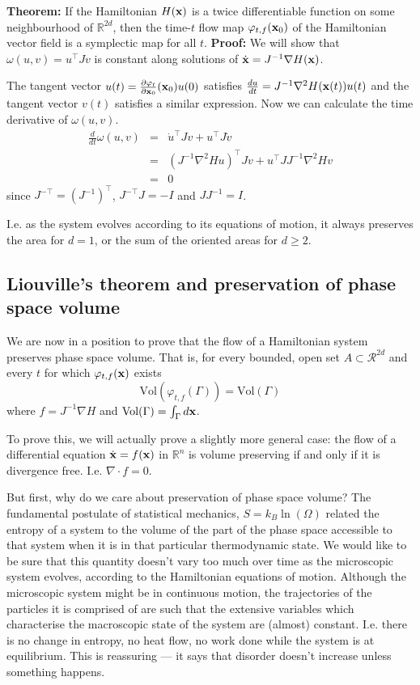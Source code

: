 \documentclass{article}
\begin{document}
{\bf Theorem:} If the Hamiltonian $H({\bf x})$ is a twice differentiable function on some neighbourhood of $\mathbb{R}^{2d}$, then the time-$t$ flow map $\varphi_{t,f}({\bf x}_0)$ of the Hamiltonian vector field is a symplectic map for all $t$.
{\bf Proof:} We will show that $\omega(u,v)=u^\top J v$ is constant along solutions of $\dot{\bf x} = J^{-1}\nabla H({\bf x})$.

The tangent vector $u(t) = \frac{\partial \varphi_t}{\partial {\bf x}_0}({\bf x}_0)u(0)$ satisfies $\frac{du}{dt} = J^{-1}\nabla^2H({\bf x}(t))u(t)$ and the tangent vector $v(t)$ satisfies a similar expression. Now we can calculate the time derivative of $\omega(u,v)$.
\begin{eqnarray*}
	\frac{d}{dt}\omega(u,v) &=& \dot{u}^{\top}Jv+u^\top J\dot{v}\\
		&=& (J^{-1}\nabla^2Hu)^\top Jv + u^\top JJ^{-1}\nabla^2Hv\\
		&=& 0
\end{eqnarray*}
since $J^{-\top}=(J^{-1})^\top$, $J^{-\top}J=-I$ and $JJ^{-1} = I$.

I.e. as the system evolves according to its equations of motion, it always preserves the area for $d=1$, or the sum of the oriented areas for $d \geq2$.


\subsection*{Liouville's theorem and preservation of phase space volume}
We are now in a position to prove that the flow of a Hamiltonian system preserves phase space volume. That is, for every bounded, open set $A\subset\mathcal{R}^{2d}$ and every $t$ for which $\varphi_{t,f}({\bf x})$ exists
$$\text{Vol}(\varphi_{t,f}(\Gamma))=\text{Vol}(\Gamma)$$
where $f=J^{-1}\nabla H$ and $\text{Vol}(\Gamma) = \int_{\Gamma}d{\bf x}$.

To prove this, we will actually prove a slightly more general case: the flow of a differential equation $\dot{\bf x}=f({\bf x})$ in $\mathbb{R}^n$ is volume preserving if and only if it is divergence free. I.e. $\nabla\cdot f=0$.

But first, why do we care about preservation of phase space volume? The fundamental postulate of statistical mechanics, $S=k_B\ln(\Omega)$ related the entropy of a system to the volume of the part of the phase space accessible to that system when it is in that particular thermodynamic state. We would like to be sure that this quantity doesn't vary too much over time as the microscopic system evolves, according to the Hamiltonian equations of motion. Although the microscopic system might be in continuous motion, the trajectories of the particles it is comprised of are such that the extensive variables which characterise the macroscopic state of the system are (almost) constant. I.e. there is no change in entropy, no heat flow, no work done while the system is at equilibrium. This is reassuring --- it says that disorder doesn't increase unless something happens.
\end{document}
